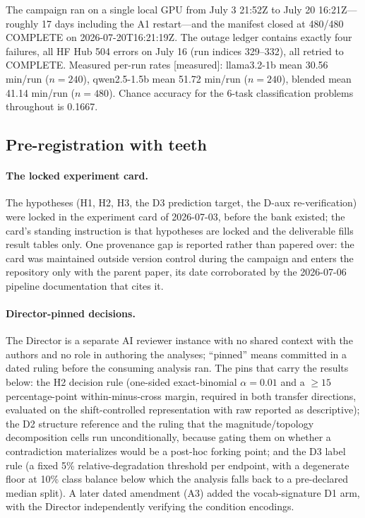 \documentclass[10pt]{article}
\begin{document}
The campaign ran on a single local GPU from July 3 21:52Z to July 20
16:21Z---roughly 17 days including the A1 restart---and the manifest
closed at 480/480 COMPLETE on 2026-07-20T16:21:19Z. The outage ledger
contains exactly four failures, all HF Hub 504 errors on July 16 (run
indices 329--332), all retried to COMPLETE. Measured per-run rates
[measured]: llama3.2-1b mean 30.56 min/run ($n = 240$), qwen2.5-1.5b mean
51.72 min/run ($n = 240$), blended mean 41.14 min/run ($n = 480$).
Chance accuracy for the 6-task classification problems throughout is
0.1667.

\subsection{Pre-registration with teeth}
\label{sec:prereg}

\paragraph{The locked experiment card.} The hypotheses (H1, H2, H3, the D3
prediction target, the D-aux re-verification) were locked in the experiment
card of 2026-07-03, before the bank existed; the card's standing
instruction is that hypotheses are locked and the deliverable fills result
tables only. One provenance gap is reported rather than papered over: the
card was maintained outside version control during the campaign and enters
the repository only with the parent paper, its date corroborated by the
2026-07-06 pipeline documentation that cites it.

\paragraph{Director-pinned decisions.} The Director is a separate AI
reviewer instance with no shared context with the authors and no role in
authoring the analyses; ``pinned'' means committed in a dated ruling before
the consuming analysis ran. The pins that carry the results below: the H2
decision rule (one-sided exact-binomial $\alpha = 0.01$ and a $\ge 15$
percentage-point within-minus-cross margin, required in both transfer
directions, evaluated on the shift-controlled representation with raw
reported as descriptive); the D2 structure reference and the ruling that
the magnitude/topology decomposition cells run unconditionally, because
gating them on whether a contradiction materializes would be a post-hoc
forking point; and the D3 label rule (a fixed 5\% relative-degradation
threshold per endpoint, with a degenerate floor at 10\% class balance
below which the analysis falls back to a pre-declared median split). A
later dated amendment (A3) added the vocab-signature D1 arm, with the
Director independently verifying the condition encodings.
\end{document}
